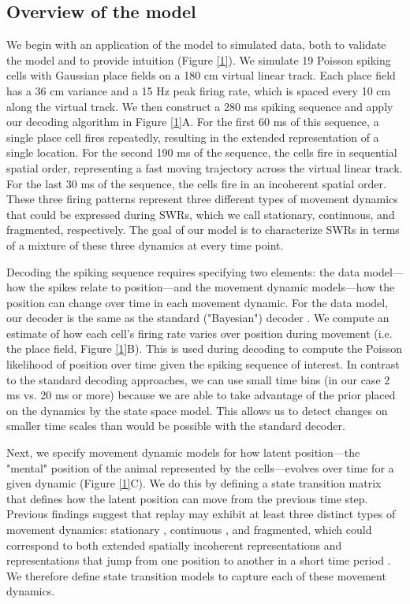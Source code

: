 \documentclass[times, twoside]{zHenriquesLab-StyleBioRxiv}
\begin{document}
\subsection*{Overview of the model}
We begin with an application of the model to simulated data, both to validate the model and to provide intuition (Figure \ref{1}). We simulate 19 Poisson spiking cells with Gaussian place fields on a 180 cm virtual linear track. Each place field has a 36 cm variance and a 15 Hz peak firing rate, which is spaced every 10 cm along the virtual track. We then construct a 280 ms spiking sequence and apply our decoding algorithm in Figure \ref{1}A. For the first 60 ms of this sequence, a single place cell fires repeatedly, resulting in the extended representation of a single location. For the second 190 ms of the sequence, the cells fire in sequential spatial order, representing a fast moving trajectory across the virtual linear track. For the last 30 ms of the sequence, the cells fire in an incoherent spatial order. These three firing patterns represent three different types of movement dynamics that could be expressed during SWRs, which we call stationary, continuous, and fragmented, respectively. The goal of our model is to characterize SWRs in terms of a mixture of these three dynamics at every time point.

Decoding the spiking sequence requires specifying two elements: the data model---how the spikes relate to position---and the movement dynamic models---how the position can change over time in each movement dynamic. For the data model, our decoder is the same as the standard ("Bayesian") decoder \cite{DavidsonHippocampalReplayExtended2009, PfeifferAutoassociativedynamicsgeneration2015, StellaHippocampalReactivationRandom2019}. We compute an estimate of how each cell's firing rate varies over position during movement (i.e. the place field, Figure \ref{1}B). This is used during decoding to compute the Poisson likelihood of position over time given the spiking sequence of interest. In contrast to the standard decoding approaches, we can use small time bins (in our case 2 ms vs. 20 ms or more) because we are able to take advantage of the prior placed on the dynamics by the state space model. This allows us to detect changes on smaller time scales than would be possible with the standard decoder.

Next, we specify movement dynamic models for how latent position---the "mental" position of the animal represented by the cells---evolves over time for a given dynamic (Figure \ref{1}C). We do this by defining a state transition matrix that defines how the latent position can move from the previous time step. Previous findings suggest that replay may exhibit at least three distinct types of movement dynamics: stationary \cite{JaiDistincthippocampalcorticalmemory2017, FarooqEmergencepreconfiguredplastic2019}, continuous \cite{DavidsonHippocampalReplayExtended2009}, and fragmented, which could correspond to both extended spatially incoherent representations and representations that jump from one position to another in a short time period \cite{PfeifferAutoassociativedynamicsgeneration2015}. We therefore define state transition models to capture each of these movement dynamics.
\end{document}
